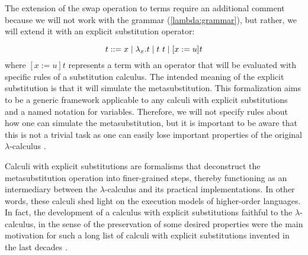  The extension of the swap operation to terms require an additional comment because we will not work with the grammar (\ref{lambda:grammar}), but rather, we will extend it with an explicit substitution operator:


\begin{equation}\label{es:grammar}
  t ::= x \mid \lambda_x.t \mid t\ t \mid \esub{t}{x}{u}
\end{equation}
\noindent where $[x := u] t$ represents a term with an operator that will be evaluated with specific rules of a substitution calculus. The intended meaning of the explicit substitution is that it will simulate the metasubstitution. This formalization aims to be a generic framework applicable to any calculi with explicit substitutions and a named notation for variables. Therefore, we will not specify rules about how one can simulate the metasubstitution, but it is important to be aware that this is not a trivial task as one can easily lose important properties of the original $\lambda$-calculus \cite{melliesTypedLcalculiExplicit1995,guillaumeLambdaCalculusDoes2000}.


Calculi with explicit substitutions are formalisms that deconstruct the metasubstitution operation into finer-grained steps, thereby functioning as an intermediary between the $\lambda$-calculus and its practical implementations. In other words, these calculi shed light on the execution models of higher-order languages. In fact, the development of a calculus with explicit substitutions faithful to the $\lambda$-calculus, in the sense of the preservation of some desired properties were the main motivation for such a long list of calculi with explicit substitutions invented in the last decades \cite{abadiExplicitSubstitutions1991,blooPreservationStrongNormalisation1995,benaissaLambdaUpsilonCalculus1996,curienConfluencePropertiesWeak1996,munozConfluencePreservationStrong1996,kamareddineExtendingLambdaCalculusExplicit1997,blooExplicitSubstitutionEdge1999,davidLambdacalculusExplicitWeakening2001,kesnerTheoryExplicitSubstitutions2009}.


